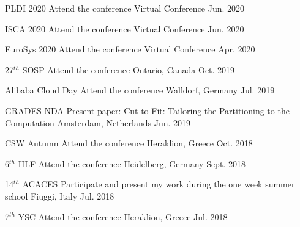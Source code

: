
\begin{cvhonors}

  \cvhonor
    {PLDI 2020} %
    {Attend the conference} %
    {Virtual Conference} %
    {Jun. 2020} %

  \cvhonor
    {ISCA 2020} %
    {Attend the conference} %
    {Virtual Conference} %
    {Jun. 2020} %

  \cvhonor
    {EuroSys 2020} %
    {Attend the conference} %
    {Virtual Conference} %
    {Apr. 2020} %

  \cvhonor
    {27$^{th}$ SOSP} %
    {Attend the conference} %
    {Ontario, Canada} %
    {Oct. 2019} %

  \cvhonor
    {Alibaba Cloud Day} %
    {Attend the conference} %
    {Walldorf, Germany} %
    {Jul. 2019} %

  \cvhonor
    {GRADES-NDA} %
    {Present paper: Cut to Fit: Tailoring the Partitioning to the
    Computation} %
    {Amsterdam, Netherlands} %
    {Jun. 2019} %

  \cvhonor
    {CSW Autumn} %
    {Attend the conference} %
    {Heraklion, Greece} %
    {Oct. 2018} %

  \cvhonor
    {6$^{th}$ HLF} %
    {Attend the conference} %
    {Heidelberg, Germany} %
    {Sept. 2018} %

  \cvhonor
    {14$^{th}$ ACACES} %
    {Participate and present my work during the one week summer school} %
    {Fiuggi, Italy} %
    {Jul. 2018} %

  \cvhonor
    {7$^{th}$ YSC} %
    {Attend the conference} %
    {Heraklion, Greece} %
    {Jul. 2018} %


\end{cvhonors}
